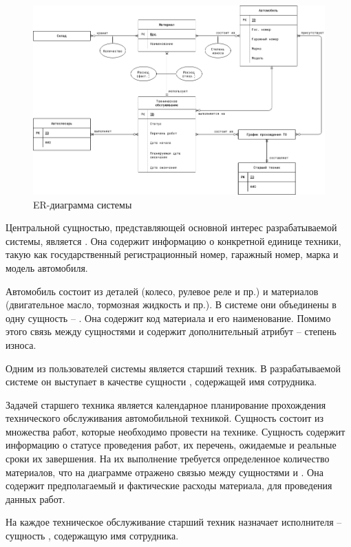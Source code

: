 \documentclass[../nirs.tex]{subfiles}
\begin{document}
\clearpage
\begin{landscape}

\begin{figure}[hp!]
  \centering
  \includegraphics[keepaspectratio,
                   width=\paperwidth]{./images/er-diagram.drawio.png}
  \caption{ER-диаграмма системы}
  \label{fig:2_1_er_diagram}
\end{figure}

\end{landscape}
\clearpage

Центральной сущностью, представляющей основной интерес разрабатываемой системы,
является . Она содержит информацию о конкретной единице
техники, такую как государственный регистрационный номер, гаражный номер, марка
и модель автомобиля.

Автомобиль состоит из деталей (колесо, рулевое реле и пр.) и материалов
(двигательное масло, тормозная жидкость и пр.). В системе они объединены в одну
сущность -- . Она содержит код материала и его наименование.
Помимо этого связь между сущностями  и
 содержит дополнительный атрибут -- степень износа.

Одним из пользователей системы является старший техник. В разрабатываемой
системе он выступает в качестве сущности , содержащей
имя сотрудника.

Задачей старшего техника является календарное планирование прохождения
технического обслуживания автомобильной техникой. Сущность  состоит из множества работ, которые необходимо провести на
технике. Сущность  содержит информацию о
статусе проведения работ, их перечень, ожидаемые и реальные сроки их завершения.
На их выполнение требуется определенное количество материалов, что на диаграмме
отражено связью между сущностями  и
. Она содержит предполагаемый и фактические расходы
материала, для проведения данных работ.

На каждое техническое обслуживание старший техник назначает исполнителя --
сущность , содержащую имя сотрудника.
\end{document}
